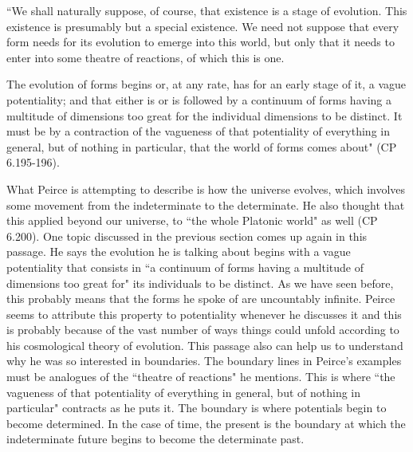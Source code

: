 \documentclass[12pt]{article}
\begin{document}
\begin{singlespace}
``We shall naturally suppose, of course, that existence is a stage of evolution. This existence is presumably but a special existence. We need not suppose that every form needs for its evolution to emerge into this world, but only that it needs to enter into some theatre of reactions, of which this is one.

 The evolution of forms begins or, at any rate, has for an early stage of it, a vague potentiality; and that either is or is followed by a continuum of forms having a multitude of dimensions too great for the individual dimensions to be distinct. It must be by a contraction of the vagueness of that potentiality of everything in general, but of nothing in particular, that the world of forms comes about" (CP 6.195-196).
\end{singlespace}
What Peirce is attempting to describe is how the universe evolves, which involves some movement from the indeterminate to the determinate. He also thought that this applied beyond our universe, to ``the whole Platonic world" as well (CP 6.200). One topic discussed in the previous section comes up again in this passage. He says the evolution he is talking about begins with a vague potentiality that consists in ``a continuum of forms having a multitude of dimensions too great for" its individuals to be distinct. As we have seen before, this probably means that the forms he spoke of are uncountably infinite. Peirce seems to attribute this property to potentiality whenever he discusses it and this is probably because of the vast number of ways things could unfold according to his cosmological theory of evolution. This passage also can help us to understand why he was so interested in boundaries. The boundary lines in Peirce's examples must be analogues of the ``theatre of reactions" he mentions. This is where ``the vagueness of that potentiality of everything in general, but of nothing in particular" contracts as he puts it. The boundary is where potentials begin to become determined. In the case of time, the present is the boundary at which the indeterminate future begins to become the determinate past.
\end{document}
